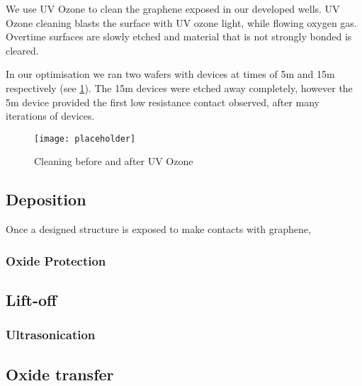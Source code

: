 \documentclass[../../Matt_Gebert_Honours_Thesis.tex]{subfiles}
\begin{document}
	We use UV Ozone to clean the graphene exposed in our developed wells. UV Ozone cleaning blasts the surface with UV ozone light, while flowing oxygen gas. Overtime surfaces are slowly etched and material that is not strongly bonded is cleared. 
	
	In our optimisation we ran two wafers with devices at times of 5m and 15m respectively (see \cref{fig:UV_ozone}). The 15m devices were etched away completely, however the 5m device provided the first low resistance contact observed, after many iterations of devices.
	
	\begin{figure}[H]
		\centering
				\texttt{[image: placeholder]}
		\caption{Cleaning before and after UV Ozone}\label{fig:UV_ozone}
	\end{figure}
	
	\subsection{Deposition}\label{sec:deposition}
	Once a designed structure is exposed to make contacts with graphene, 
	
	\subsubsection{Oxide Protection}\label{sec:deposition_oxide_protection}
	
	\subsection{Lift-off}\label{}
	\subsubsection{Ultrasonication}
	
	\subsection{Oxide transfer}
	
	
\end{document}
